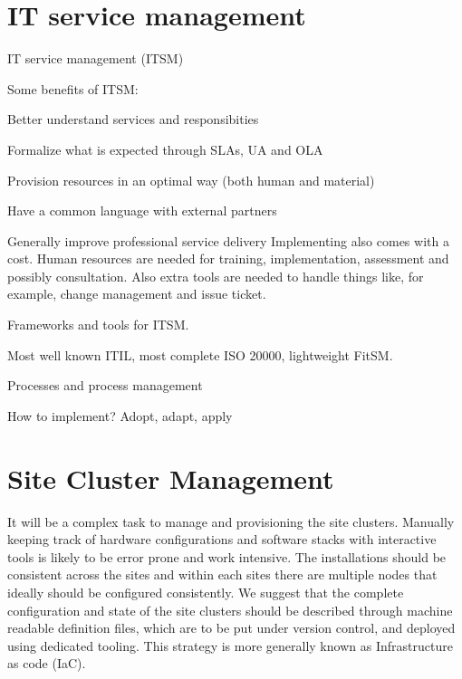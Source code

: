 \documentclass[12pt,a4paper]{article}
\begin{document}
\section{IT service management}


IT service management (ITSM) %

Some benefits of ITSM:
\bitm
\item Better understand services and responsibities
\item Formalize what is expected through SLAs, UA and OLA%
\item Provision resources in an optimal way (both human and material)
\item Have a common language with external partners
\item Generally improve professional service delivery
\eitm
Implementing also comes with a cost. Human resources are needed for
training, implementation, assessment and possibly consultation. Also
extra tools are needed to handle things like, for example, change management and issue ticket.

Frameworks and tools for ITSM. 

Most well known ITIL, most complete ISO 20000, lightweight FitSM.

Processes and process management %

How to implement? Adopt, adapt, apply

\section{Site Cluster Management}

It will be a complex task to manage and provisioning the site
clusters. Manually keeping track of hardware configurations and
software stacks with interactive tools is likely to be error prone and
work intensive. The installations should be consistent across the
sites and within each sites there are multiple nodes that ideally
should be configured consistently. We suggest that the complete
configuration and state of the site clusters should be described
through machine readable definition files, which are to be put under
version control, and deployed using dedicated tooling. 
This strategy is more generally known as Infrastructure as code (IaC).
\end{document}
